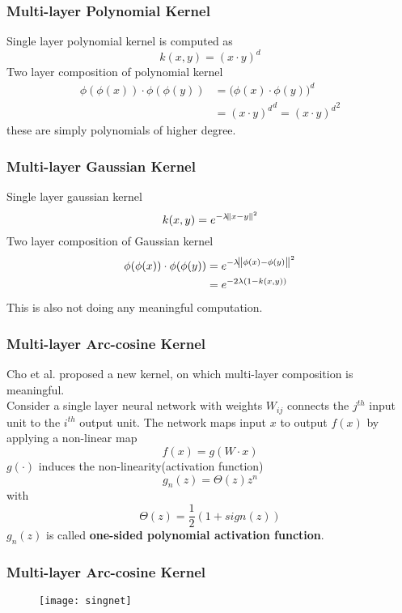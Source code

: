 \documentclass[a4paper,compress,svgnames]{beamer}
\begin{document}
\begin{frame}
\frametitle{Multi-layer Polynomial Kernel}
Single layer polynomial kernel is computed as
\[k(x, y) = (x \cdot y)^d\]
Two layer composition of polynomial kernel
\begin{equation*}
\begin{aligned}
\phi(\phi(x)) \cdot \phi(\phi(y)) &= \bigg(\phi(x) \cdot \phi(y)\bigg)^d \\
& = {(x\cdot y)^d}^d =  {(x\cdot y)^d}^2 
\end{aligned}
\end{equation*}
these are simply polynomials of higher degree.
\end{frame}

\begin{frame}
\frametitle{Multi-layer Gaussian Kernel}
Single layer gaussian kernel
\[ k(x, y) = e^{-\lambda\norm{x-y}^2} \]
Two layer composition of Gaussian kernel
\begin{equation*}
\begin{aligned}
\phi(\phi(x)) \cdot \phi(\phi(y)) &= e^{-\lambda\norm{\phi(x)-\phi(y)}^2} \\
& = e^{-2\lambda(1-k(x, y))}
\end{aligned}
\end{equation*}
This is also not doing any meaningful computation.
\end{frame}

\begin{frame}
\frametitle{Multi-layer Arc-cosine Kernel}
Cho et al. proposed a new kernel, on which multi-layer composition is meaningful.\\
Consider a single layer neural network with weights $W_{ij}$ connects the $j^{th}$ input unit to the $i^{th}$ output unit. The network maps input $x$ to output $f(x)$ by applying a non-linear map 
\[ f(x) = g(W \cdot x) \]
$g(\cdot)$ induces the non-linearity(activation function)
\[g_n(z) = \Theta(z)z^n \]
with 
\[ \Theta(z) = \frac{1}{2}(1+sign(z)) \]
$g_n(z)$ is called \textbf{one-sided polynomial activation function}.
\end{frame}

\begin{frame}
\frametitle{Multi-layer Arc-cosine Kernel}
\begin{figure}
\texttt{[image: singnet]}
\end{figure}
\end{frame}
\end{document}
